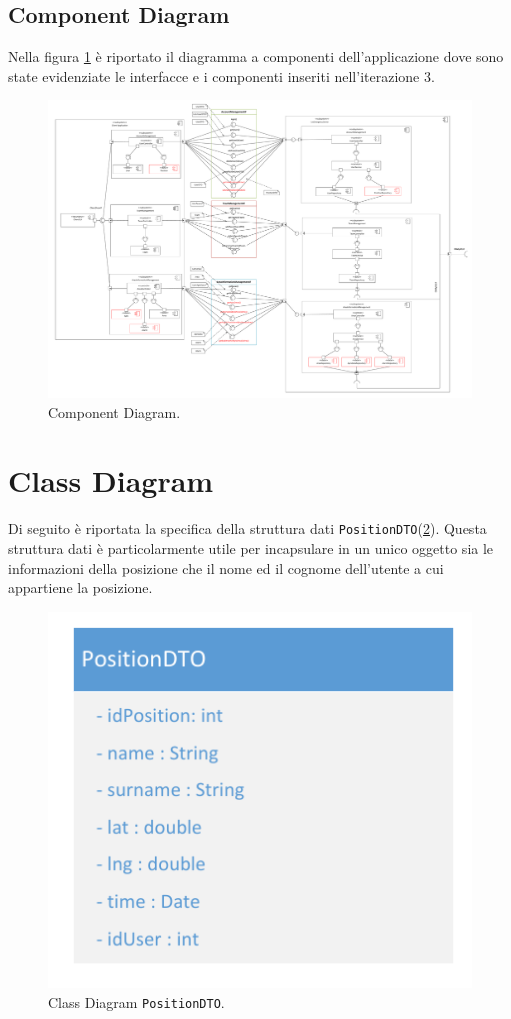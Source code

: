 \begin{landscape}
	\section{Component Diagram}
	Nella figura \ref{fig:ComponentDiagram_iterazione3} è riportato il diagramma a componenti dell'applicazione dove sono state evidenziate le interfacce e i componenti inseriti nell'iterazione 3. 
	\begin{figure}[tbh!]
		\centering
		\includegraphics[width=0.8\linewidth]{./Iterazione 3/OtherFiles/UML - Component view}
		\caption{Component Diagram.}
		\label{fig:ComponentDiagram_iterazione3}
	\end{figure}
\end{landscape}
\clearpage

\section{Class Diagram}
Di seguito è riportata la specifica della struttura dati \texttt{PositionDTO}(\Fig\ref{fig:ClassDiagramDTO_iterazione3}). Questa struttura dati è particolarmente utile per incapsulare in un unico oggetto sia le informazioni della posizione che il nome ed il cognome dell'utente a cui appartiene la posizione.

\begin{figure}[h!]
	\centering
	\includegraphics[width=0.5\linewidth]{./Iterazione 3/OtherFiles/DTOSpecification}
	\caption{Class Diagram \texttt{PositionDTO}.}
	\label{fig:ClassDiagramDTO_iterazione3}
\end{figure}

